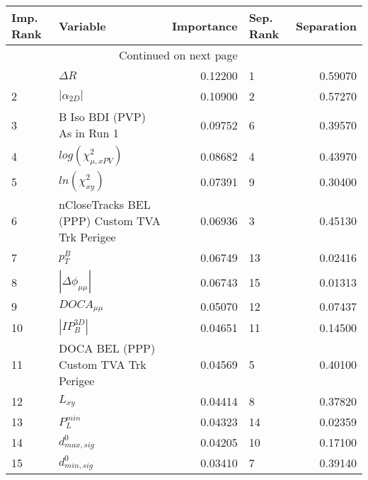 \usepackage{lscape}

\begin{landscape}
\begin{longtable}{llrlr}
\toprule
Imp. Rank &                                       Variable &  Importance & Sep. Rank &  Separation \\
\midrule
\endhead
\midrule
\multicolumn{3}{r}{{Continued on next page}} \\
\midrule
\endfoot

\bottomrule
\endlastfoot
        1 &                                     $\Delta R$ &     0.12200 &         1 &     0.59070 \\
        2 &                                $|\alpha_{2D}|$ &     0.10900 &         2 &     0.57270 \\
        3 &                    B Iso BDI (PVP) As in Run 1 &     0.09752 &         6 &     0.39570 \\
        4 &                      $log(\chi^{2}_{\mu,xPV})$ &     0.08682 &         4 &     0.43970 \\
        5 &                            $ln(\chi^{2}_{xy})$ &     0.07391 &         9 &     0.30400 \\
        6 &  nCloseTracks BEL (PPP) Custom TVA Trk Perigee &     0.06936 &         3 &     0.45130 \\
        7 &                                      $p^B_{T}$ &     0.06749 &        13 &     0.02416 \\
        8 &                       $|\Delta \phi_{\mu\mu}|$ &     0.06743 &        15 &     0.01313 \\
        9 &                                $DOCA_{\mu\mu}$ &     0.05070 &        12 &     0.07437 \\
       10 &                                $|IP_{B}^{3D}|$ &     0.04651 &        11 &     0.14500 \\
       11 &          DOCA BEL (PPP) Custom TVA Trk Perigee &     0.04569 &         5 &     0.40100 \\
       12 &                                       $L_{xy}$ &     0.04414 &         8 &     0.37820 \\
       13 &                                  $P^{min}_{L}$ &     0.04323 &        14 &     0.02359 \\
       14 &                               $d^0_{max, sig}$ &     0.04205 &        10 &     0.17100 \\
       15 &                               $d^0_{min, sig}$ &     0.03410 &         7 &     0.39140 \\
\end{longtable}

\end{landscape}
